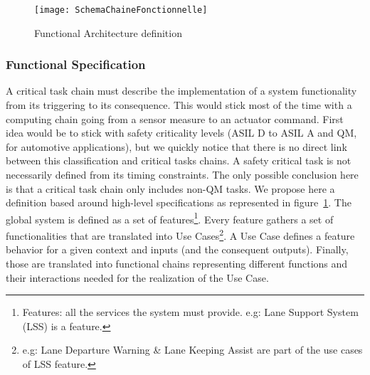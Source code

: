 \documentclass[french, a4paper, 11pt, twoside, pdftex]{StyleThese}
\begin{document}
        \begin{figure}[h]
            \centering
            \texttt{[image: SchemaChaineFonctionnelle]}
            \caption{Functional Architecture definition} \label{fig:funcArch}
        \end{figure}
        \smallbreak
        \subsubsection{Functional Specification} 
            A critical task chain must describe the implementation of a system functionality from its triggering to its consequence. This would stick most of the time with a computing chain going from a sensor measure to an actuator command. First idea would be to stick with safety criticality levels (ASIL D to ASIL A and QM, for automotive applications), but we quickly notice that there is no direct link between this classification and critical tasks chains. A safety critical task is not necessarily defined from its timing constraints. The only possible conclusion here is that a critical task chain only includes non-QM tasks. 
            \smallbreak
            We propose here a definition based around high-level specifications as represented in figure~\ref{fig:funcArch}. The global system is defined as a set of features\footnote{Features: all the services the system must provide. e.g: Lane Support System (LSS) is a feature.}. Every feature gathers a set of functionalities that are translated into Use Cases\footnote{e.g: Lane Departure Warning \& Lane Keeping Assist are part of the use cases of LSS feature.}. A Use Case defines a feature behavior for a given context and inputs (and the consequent outputs). Finally, those are translated into functional chains representing different functions and their interactions needed for the realization of the Use Case. 
            
\end{document}
